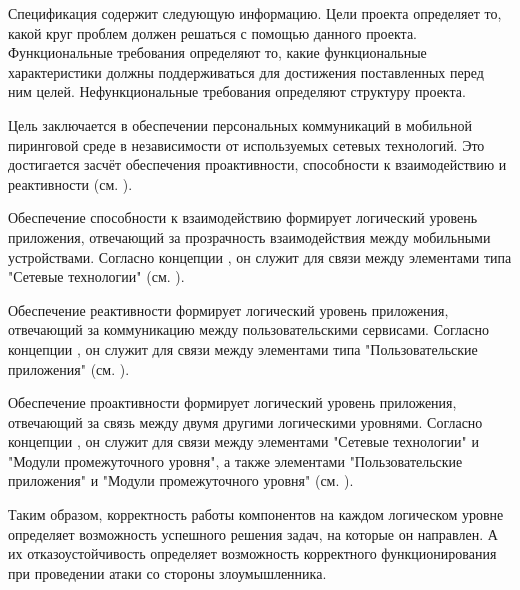 %
Спецификация  содержит следующую информацию.
%
Цели проекта определяет то, какой круг проблем должен решаться с помощью данного проекта. 
%
Функциональные требования определяют то, какие функциональные характеристики должны поддерживаться  для достижения поставленных перед ним целей. 
%
Нефункциональные требования определяют структуру проекта. 



%
Цель  заключается в обеспечении персональных коммуникаций в мобильной пиринговой среде в независимости от используемых сетевых технологий. 
%
Это достигается засчёт обеспечения проактивности, способности к взаимодействию и реактивности (см. ).

%
Обеспечение способности к взаимодействию формирует логический уровень приложения, отвечающий за прозрачность взаимодействия между мобильными устройствами.
%
Согласно концепции , он служит для связи между элементами типа "Сетевые технологии" (см. ). 

%
Обеспечение реактивности формирует логический уровень приложения, отвечающий за коммуникацию между пользовательскими сервисами. 
%
Согласно концепции , он служит для связи между элементами типа "Пользовательские приложения" (см. ). 

%
Обеспечение проактивности формирует логический уровень приложения, отвечающий за связь между двумя другими логическими уровнями. 
%
Согласно концепции , он служит для связи между элементами "Сетевые технологии" и "Модули промежуточного уровня", а также элементами "Пользовательские приложения" и "Модули промежуточного уровня" (см. ). 

%
Таким образом, корректность работы компонентов  на каждом логическом уровне определяет возможность успешного решения задач, на которые он направлен. 
%
А их отказоустойчивость определяет возможность корректного функционирования  при проведении атаки со стороны злоумышленника.

